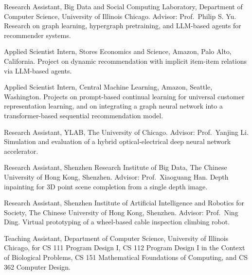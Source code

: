 \begin{list}{}{%
  \setlength{\leftmargin}{1.6in}%
  \setlength{\labelwidth}{1.4in}%
  \setlength{\labelsep}{0.2in}%
  \setlength{\itemsep}{0.4em}%
  \setlength{\topsep}{0.5em}%
  \setlength{\parsep}{0pt}%
  \let\makelabel\vitalabel}
\item[2021--2026] Research Assistant, Big Data and Social Computing Laboratory, Department of Computer Science, University of Illinois Chicago. Advisor: Prof.~Philip S. Yu. Research on graph learning, hypergraph pretraining, and LLM-based agents for recommender systems.
\item[2025] Applied Scientist Intern, Stores Economics and Science, Amazon, Palo Alto, California. Project on dynamic recommendation with implicit item-item relations via LLM-based agents.
\item[2024] Applied Scientist Intern, Central Machine Learning, Amazon, Seattle, Washington. Projects on prompt-based continual learning for universal customer representation learning, and on integrating a graph neural network into a transformer-based sequential recommendation model.
\item[2019--2021] Research Assistant, YLAB, The University of Chicago. Advisor: Prof.~Yanjing Li. Simulation and evaluation of a hybrid optical-electrical deep neural network accelerator.
\item[2018--2019] Research Assistant, Shenzhen Research Institute of Big Data, The Chinese University of Hong Kong, Shenzhen. Advisor: Prof.~Xiaoguang Han. Depth inpainting for 3D point scene completion from a single depth image.
\item[2017--2018] Research Assistant, Shenzhen Institute of Artificial Intelligence and Robotics for Society, The Chinese University of Hong Kong, Shenzhen. Advisor: Prof.~Ning Ding. Virtual prototyping of a wheel-based cable inspection climbing robot.
\end{list}

\vspace{0.6em}

\begin{list}{}{%
  \setlength{\leftmargin}{1.6in}%
  \setlength{\labelwidth}{1.4in}%
  \setlength{\labelsep}{0.2in}%
  \setlength{\itemsep}{0.4em}%
  \setlength{\topsep}{0.5em}%
  \setlength{\parsep}{0pt}%
  \let\makelabel\vitalabel}
\item[2021--2024] Teaching Assistant, Department of Computer Science, University of Illinois Chicago, for CS 111 Program Design I, CS 112 Program Design I in the Context of Biological Problems, CS 151 Mathematical Foundations of Computing, and CS 362 Computer Design.
\end{list}

